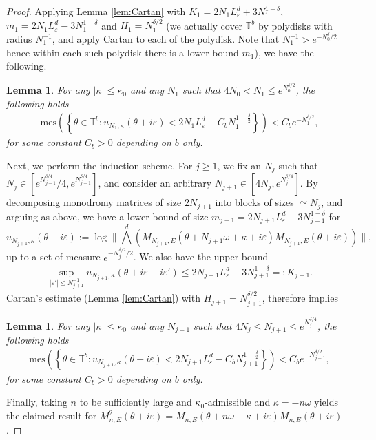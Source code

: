 \documentclass[11pt]{amsart}
\newtheorem{lemma}[theorem]{Lemma}
\newcommand{\T}{\mathbb T}
\begin{document}
\begin{proof}
Applying Lemma \ref{lem:Cartan} with $K_1=2N_1L^d_{\varepsilon}+3N_1^{1-\delta}$, $m_1=2N_1L^d_{\varepsilon}-3N_1^{1-\delta}$ and $H_1=N_1^{\delta/2}$ (we actually cover $\T^b$ by polydisks with radius $N_1^{-1}$, and apply Cartan to each of the polydisk. Note that $N_1^{-1}>e^{-N_0^{\delta}/2}$ hence within each such polydisk there is a lower bound $m_1$), we have the following.
\begin{lemma}\label{eq:LDT_M2_N1}
For any $|\kappa|\leq \kappa_0$ and any $N_1$ such that $4N_0<N_1\leq e^{N_0^{\delta/2}}$, the following holds
\begin{align}
    \mathrm{mes}\left(\left\{\theta\in \T^b: u_{N_1,\kappa}(\theta+i\varepsilon)<2N_1L^d_{\varepsilon}-C_b N_1^{1-\frac{\delta}{2}}\right\}\right)<C_b e^{-N_1^{\delta/2}},
\end{align}
for some constant $C_b>0$ depending on $b$ only.
\end{lemma}
Next, we perform the induction scheme. 
For $j\geq 1$, we fix an $N_j$ such that $N_j\in [e^{N_{j-1}^{\delta/4}}/4, e^{N_{j-1}^{\delta/4}}]$, and consider an arbitrary $N_{j+1}\in [4N_j, e^{N_j^{\delta/4}}]$.
By decomposing monodromy matrices of size $2N_{j+1}$ into blocks of sizes $\simeq N_j$, and arguing as above, we have a lower bound of size $m_{j+1}=2N_{j+1}L^d_{\varepsilon}-3N_{j+1}^{1-\delta}$ for 
\[ u_{N_{j+1},\kappa}(\theta+i\varepsilon):=\log \|\textstyle{\bigwedge}^d \left(M_{N_{j+1},E}(\theta+N_{j+1}\omega+\kappa+i\varepsilon) M_{N_{j+1},E}(\theta+i\varepsilon)\right)\|,\]
up to a set of measure $e^{-N_j^{\delta/2}/2}$.
We also have the upper bound
\begin{align}
\sup_{|\varepsilon'|\leq N_{j+1}^{-1}} u_{N_{j+1},\kappa}(\theta+i\varepsilon+i\varepsilon')\leq 2N_{j+1}L^d_{\varepsilon}+3N_{j+1}^{1-\delta}=:K_{j+1}.
\end{align}
Cartan's estimate (Lemma \ref{lem:Cartan}) with $H_{j+1}=N_{j+1}^{\delta/2}$, therefore implies
\begin{lemma}
For any $|\kappa|\leq \kappa_0$ and any $N_{j+1}$ such that $4N_j\leq N_{j+1}\leq e^{N_j^{\delta/4}}$, the following holds
    \begin{align}
    \mathrm{mes}\left(\left\{\theta\in \T^b: u_{N_{j+1},\kappa}(\theta+i\varepsilon)<2N_{j+1}L^d_{\varepsilon}-C_b N_{j+1}^{1-\frac{\delta}{2}}\right\}\right)<C_b e^{-N_{j+1}^{\delta/2}},
\end{align}
for some constant $C_b>0$ depending on $b$ only.
\end{lemma}
Finally, taking $n$ to be sufficiently large and $\kappa_0$-admissible and $\kappa=-n\omega$ yields the claimed result for 
$M_{n,E}^2(\theta+i\varepsilon)=M_{n,E}(\theta+n\omega+\kappa+i\varepsilon)M_{n,E}(\theta+i\varepsilon)$.
\end{proof}
\end{document}
